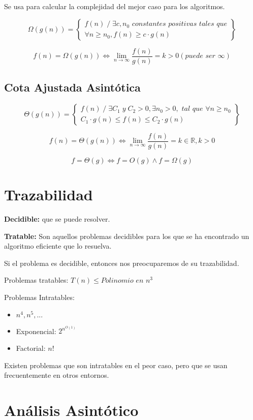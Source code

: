 Se usa para calcular la complejidad del mejor caso para los algoritmos.

$$\Omega(g(n))=\left\{\begin{matrix}
  f(n)\;/\;\exists c, n_0 \textit{ constantes positivas tales que}  \\
  \forall n \geq n_0, f(n) \geq c \cdot g(n)
  \end{matrix}\right\}$$

$$f(n)=\Omega(g(n)) \Leftrightarrow \lim_{n \rightarrow \infty} \frac{f(n)}{g(n)}= k > 0 (\textit{puede ser }\infty)$$

\subsection{Cota Ajustada Asintótica}
$$\Theta(g(n))=\left\{\begin{matrix}
  f(n)\;/\;\exists C_1 \;y\; C_2 >0, \exists n_0>0, \textit{ tal que } \forall n \geq n_0  \\
  C_1 \cdot g(n) \leq f(n) \leq C_2 \cdot g(n)
  \end{matrix}\right\}$$

$$f(n)=\Theta(g(n)) \Leftrightarrow \lim_{n \rightarrow \infty} \frac{f(n)}{g(n)}= k \in \mathbb{R}, k > 0$$

$$f = \Theta(g) \Leftrightarrow f = O(g) \wedge f = \Omega(g) $$

\section{Trazabilidad}\label{sec:tratabilidad}
\textbf{Decidible:} que se puede resolver.

\textbf{Tratable:} Son aquellos problemas decidibles para los que se ha encontrado un algoritmo eficiente que lo resuelva.

Si el problema es decidible, entonces nos preocuparemos de su trazabilidad.

Problemas tratables: $T(n) \leq \textit{Polinomio en } n^3$

Problemas Intratables:
\begin{itemize}
  \item $n^4, n^5, ...$
  \item Exponencial: $2^{n^{O(1)}}$
  \item Factorial: $n!$
\end{itemize} 

Existen problemas que son intratables en el peor caso, pero que se usan frecuentemente en otros entornos.

\section{Análisis Asintótico}\label{sec:análisis-asintótico}